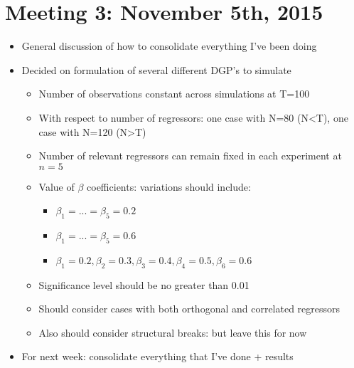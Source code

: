 \documentclass[11pt, oneside]{book}   	%
\begin{document}
\section{Meeting 3: November 5th, 2015}
\begin{itemize}
\item General discussion of how to consolidate everything I've been doing
\item Decided on formulation of several different DGP's to simulate
\begin{itemize}
\item Number of observations constant across simulations at T=100
\item With respect to number of regressors: one case with N=80 (N\textless T), one case with N=120 (N\textgreater T)
\item Number of relevant regressors can remain fixed in each experiment at $n=5$
\item Value of $\beta$ coefficients: variations should include:
\begin {itemize}
\item $\beta_{1}=...=\beta_{5}=0.2$
\item $\beta_{1}=...=\beta_{5}=0.6$
\item $\beta_{1}=0.2, \beta_{2}=0.3, \beta_{3}=0.4, \beta_{4}=0.5, \beta_{6}=0.6$
\end{itemize}
\item Significance level should be no greater than 0.01
\item Should consider cases with both orthogonal and correlated regressors
\item Also should consider structural breaks: but leave this for now
\end{itemize}
\item For next week: consolidate everything that I've done + results
\end{itemize}
\end{document}
